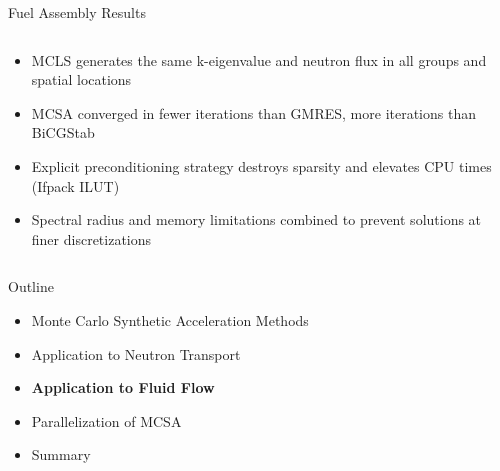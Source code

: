 \documentclass{beamer}
\begin{document}
\begin{frame}{Fuel Assembly Results}
\begin{columns}
    \begin{column}{0.5\textwidth}
      
      \begin{itemize}
        \item MCLS generates the same k-eigenvalue and neutron flux in
          all groups and spatial locations
          \bigskip
        \item MCSA converged in fewer iterations than GMRES, more
          iterations than BiCGStab
          \bigskip
        \item Explicit preconditioning strategy destroys sparsity and
          elevates CPU times (Ifpack ILUT)
          \bigskip
        \item Spectral radius and memory limitations combined to
          prevent solutions at finer discretizations
      \end{itemize}

    \end{column}

  \end{columns}

\end{frame}

\begin{frame}{Outline}

  \begin{itemize}
  \item Monte Carlo Synthetic Acceleration Methods
    \bigskip
  \item Application to Neutron Transport
    \bigskip
  \item \textbf{Application to Fluid Flow}
    \bigskip
  \item Parallelization of MCSA
    \bigskip
  \item Summary
  \end{itemize}

\end{frame}
\end{document}

